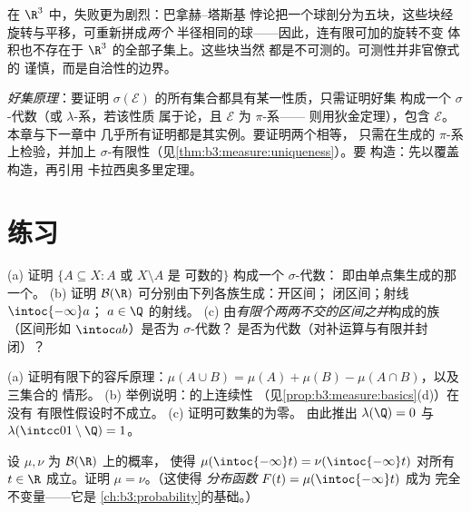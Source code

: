 \begin{remark}\label{rem:b3:measure:banachtarski}
在 $\R^3$ 中，失败更为剧烈：巴拿赫--塔斯基
悖论把一个球剖分为五块，这些块经
旋转与平移，可重新拼成\emph{两个}
半径相同的球——因此，连有限可加的旋转不变
体积也不存在于 $\R^3$ 的全部子集上。这些块当然
都是不可测的。可测性并非官僚式的
谨慎，而是自洽性的边界。
\end{remark}

\begin{method}\label{met:b3:measure:goodsets}
\emph{好集原理}：要证明
$\sigma(\mathcal E)$ 的所有集合都具有某一性质，只需证明好集
构成一个 $\sigma$-代数（或 $\lambda$-系，若该性质
属于论，且 $\mathcal E$ 为 $\pi$-系——
则用狄金定理），包含 $\mathcal E$。本章与下一章中
几乎所有证明都是其实例。要证明两个相等，
只需在生成的 $\pi$-系上检验，并加上
$\sigma$-有限性（见\cref{thm:b3:measure:uniqueness}）。要
构造：先以覆盖构造，再引用
卡拉西奥多里定理。
\end{method}

\section{练习}

\begin{exercise}[$\star$]\label{exo:b3:measure:1}
(a) 证明 $\{A \subseteq X : A$ 或 $X\setminus A$ 是
可数的$\}$ 构成一个 $\sigma$-代数：
即由单点集生成的那一个。
(b) 证明 $\mathcal B(\R)$ 可分别由下列各族生成：开区间；
闭区间；射线 $\intoc{-\infty}a$；
$a \in \Q$ 的射线。
(c) 由\emph{有限个两两不交的区间之并}构成的族
（区间形如 $\intoc ab$）是否为 $\sigma$-代数？
是否为代数（对补运算与有限并封闭）？
\end{exercise}

\begin{exercise}[$\star$]\label{exo:b3:measure:2}
(a) 证明有限下的容斥原理：$\mu(A\cup
B) = \mu(A) + \mu(B) - \mu(A\cap B)$，以及三集合的
情形。
(b) 举例说明：的上连续性
（见\cref{prop:b3:measure:basics}(d)）在没有
有限性假设时不成立。
(c) 证明可数集的为零。
由此推出 $\lambda(\Q) = 0$ 与 $\lambda(\intcc01\setminus\Q) =
1$。
\end{exercise}

\begin{exercise}[$\star\star$]\label{exo:b3:measure:3}
设 $\mu, \nu$ 为 $\mathcal B(\R)$ 上的概率，
使得 $\mu(\intoc{-\infty}t) = \nu(\intoc{-\infty}t)$ 对所有
$t \in \R$ 成立。证明 $\mu = \nu$。（这使得
\emph{分布函数} $F(t) = \mu(\intoc{-\infty}t)$ 成为
完全不变量——它是
\cref{ch:b3:probability}的基础。）
\end{exercise}

